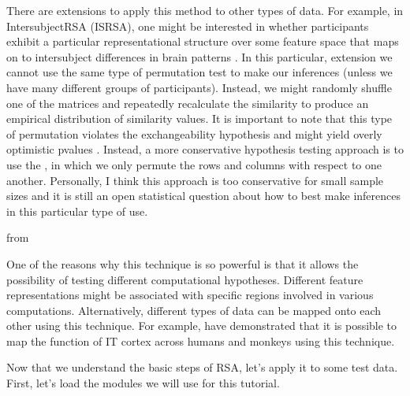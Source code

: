 \documentclass[letterpaper,10pt,english]{sphinxmanual}
\begin{document}
There are extensions to apply this method to other types of data. For example, in Intersubject\sphinxhyphen{}RSA (IS\sphinxhyphen{}RSA), one might be interested in whether participants exhibit a particular representational structure over some feature space that maps on to inter\sphinxhyphen{}subject differences in brain patterns . In this particular, extension we cannot use the same type of permutation test to make our inferences (unless we have many different groups of participants). Instead, we might randomly shuffle one of the matrices and repeatedly re\sphinxhyphen{}calculate the similarity to produce an empirical distribution of similarity values. It is important to note that this type of permutation violates the exchangeability hypothesis and might yield overly optimistic p\sphinxhyphen{}values . Instead, a more conservative hypothesis testing approach is to use the , in which we only permute the rows and columns with respect to one another. Personally, I think this approach is too conservative for small sample sizes and it is still an open statistical question about how to best make inferences in this particular type of use.

from 

One of the reasons why this technique is so powerful is that it allows the possibility of testing different computational hypotheses. Different feature representations might be associated with specific regions involved in various computations. Alternatively, different types of data can be mapped onto each other using this technique. For example,  have demonstrated that it is possible to map the function of IT cortex across humans and monkeys using this technique.

Now that we understand the basic steps of RSA, let’s apply it to some test data. First, let’s load the modules we will use for this tutorial.
\end{document}
